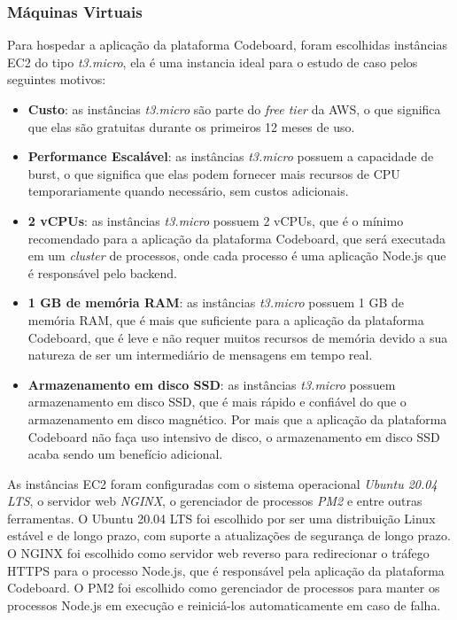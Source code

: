 \subsubsection{Máquinas Virtuais}

Para hospedar a aplicação da plataforma Codeboard, foram escolhidas instâncias EC2 do tipo \emph{t3.micro}, ela é uma instancia ideal para o estudo de caso pelos seguintes motivos: 

\begin{itemize}
    \item \textbf{Custo}: as instâncias \emph{t3.micro} são parte do \emph{free tier} da AWS, o que significa que elas são gratuitas durante os primeiros 12 meses de uso.
    \item \textbf{Performance Escalável}: as instâncias \emph{t3.micro} possuem a capacidade de burst, o que significa que elas podem fornecer mais recursos de CPU temporariamente quando necessário, sem custos adicionais.
    \item \textbf{2 vCPUs}: as instâncias \emph{t3.micro} possuem 2 vCPUs, que é o mínimo recomendado para a aplicação da plataforma Codeboard, que será executada em um \emph{cluster} de processos, onde cada processo é uma aplicação Node.js que é responsável pelo backend.
    \item \textbf{1 GB de memória RAM}: as instâncias \emph{t3.micro} possuem 1 GB de memória RAM, que é mais que suficiente para a aplicação da plataforma Codeboard, que é leve e não requer muitos recursos de memória devido a sua natureza de ser um intermediário de mensagens em tempo real.
    \item \textbf{Armazenamento em disco SSD}: as instâncias \emph{t3.micro} possuem armazenamento em disco SSD, que é mais rápido e confiável do que o armazenamento em disco magnético. Por mais que a aplicação da plataforma Codeboard não faça uso intensivo de disco, o armazenamento em disco SSD acaba sendo um benefício adicional.
\end{itemize}

As instâncias EC2 foram configuradas com o sistema operacional \emph{Ubuntu 20.04 LTS}, o servidor web \emph{NGINX}, o gerenciador de processos \emph{PM2} e entre outras ferramentas. O Ubuntu 20.04 LTS foi escolhido por ser uma distribuição Linux estável e de longo prazo, com suporte a atualizações de segurança de longo prazo. O NGINX foi escolhido como servidor web reverso para redirecionar o tráfego HTTPS para o processo Node.js, que é responsável pela aplicação da plataforma Codeboard. O PM2 foi escolhido como gerenciador de processos para manter os processos Node.js em execução e reiniciá-los automaticamente em caso de falha. 

